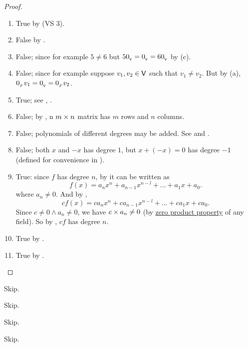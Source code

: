 \begin{proof}
\begin{enumerate}
\item True by (VS 3).
\item False by .
\item False; since for example \(5 \ne 6\) but \(5 0_{_{\textsf{V}}} = 0_{_{\textsf{V}}} = 6 0_{_{\textsf{V}}}\) by (c).
\item False; since for example suppose \(v_1, v_2 \in \textsf{V}\) such that \(v_1 \ne v_2\).
    But by (a), \(0_{_F} v_1 = 0_{_{\textsf{V}}} = 0_{_F} v_2\).
\item True; see , .
\item False; by , n \(m \times n\) matrix has \(m\) rows and \(n\) columns.
\item False; polynomials of different degrees may be added. See  and .
\item False; both \(x\) and \(-x\) has degree \(1\), but \(x + (-x) = 0\) has degree \(-1\) (defined for convenience in ).
\item True: since \(f\) has degree \(n\), by  it can be written as
    \[
        f(x) = {a_n} x^n + a_{n-1} x^{n-l} + ... + a_1 x + a_0.
    \]
    where \(a_n \ne 0\).
    And by ,
    \[
        cf(x) = c {a_n} x^n + c a_{n-1} x^{n-l} + ... + c a_1 x + c a_0.
    \]
    Since \(c \ne 0 \land a_n \ne 0\), we have \(c \times a_n \ne 0\) (by \href{https://www.wikiwand.com/en/Zero-product_property}{zero product property} of any field).
    So by , \(cf\) has degree \(n\).
\item True by .
\item True by .
\end{enumerate}
\end{proof}

\begin{exercise} \label{exercise 1.2.2}
Skip.
\end{exercise}

\begin{exercise} \label{exercise 1.2.3}
Skip.
\end{exercise}

\begin{exercise} \label{exercise 1.2.4}
Skip.
\end{exercise}

\begin{exercise} \label{exercise 1.2.5}
Skip.
\end{exercise}

